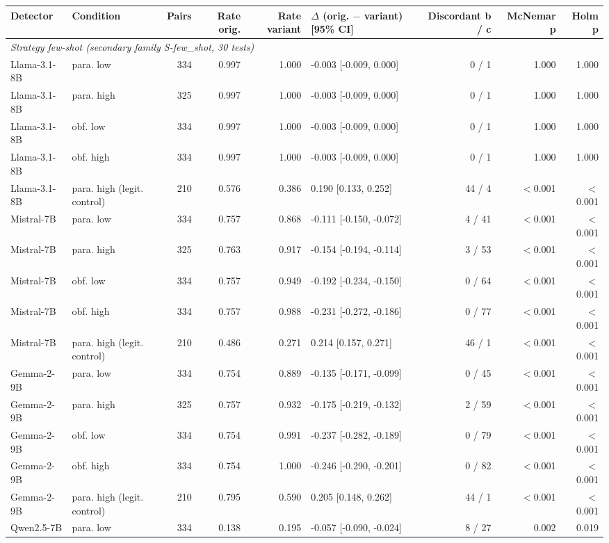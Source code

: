 \begin{tabular}{llrrrlrrr}
\toprule
Detector & Condition & Pairs & Rate orig. & Rate variant & $\Delta$ (orig. $-$ variant) [95\% CI] & Discordant b / c & McNemar p & Holm p \\
\midrule
\multicolumn{9}{l}{\textit{Strategy few-shot (secondary family S-few\_shot, 30 tests)}} \\
Llama-3.1-8B & para. low & 334 & 0.997 & 1.000 & -0.003 [-0.009, 0.000] & 0 / 1 & 1.000 & 1.000 \\
Llama-3.1-8B & para. high & 325 & 0.997 & 1.000 & -0.003 [-0.009, 0.000] & 0 / 1 & 1.000 & 1.000 \\
Llama-3.1-8B & obf. low & 334 & 0.997 & 1.000 & -0.003 [-0.009, 0.000] & 0 / 1 & 1.000 & 1.000 \\
Llama-3.1-8B & obf. high & 334 & 0.997 & 1.000 & -0.003 [-0.009, 0.000] & 0 / 1 & 1.000 & 1.000 \\
Llama-3.1-8B & para. high (legit. control) & 210 & 0.576 & 0.386 & 0.190 [0.133, 0.252] & 44 / 4 & $<$0.001 & $<$0.001 \\
Mistral-7B & para. low & 334 & 0.757 & 0.868 & -0.111 [-0.150, -0.072] & 4 / 41 & $<$0.001 & $<$0.001 \\
Mistral-7B & para. high & 325 & 0.763 & 0.917 & -0.154 [-0.194, -0.114] & 3 / 53 & $<$0.001 & $<$0.001 \\
Mistral-7B & obf. low & 334 & 0.757 & 0.949 & -0.192 [-0.234, -0.150] & 0 / 64 & $<$0.001 & $<$0.001 \\
Mistral-7B & obf. high & 334 & 0.757 & 0.988 & -0.231 [-0.272, -0.186] & 0 / 77 & $<$0.001 & $<$0.001 \\
Mistral-7B & para. high (legit. control) & 210 & 0.486 & 0.271 & 0.214 [0.157, 0.271] & 46 / 1 & $<$0.001 & $<$0.001 \\
Gemma-2-9B & para. low & 334 & 0.754 & 0.889 & -0.135 [-0.171, -0.099] & 0 / 45 & $<$0.001 & $<$0.001 \\
Gemma-2-9B & para. high & 325 & 0.757 & 0.932 & -0.175 [-0.219, -0.132] & 2 / 59 & $<$0.001 & $<$0.001 \\
Gemma-2-9B & obf. low & 334 & 0.754 & 0.991 & -0.237 [-0.282, -0.189] & 0 / 79 & $<$0.001 & $<$0.001 \\
Gemma-2-9B & obf. high & 334 & 0.754 & 1.000 & -0.246 [-0.290, -0.201] & 0 / 82 & $<$0.001 & $<$0.001 \\
Gemma-2-9B & para. high (legit. control) & 210 & 0.795 & 0.590 & 0.205 [0.148, 0.262] & 44 / 1 & $<$0.001 & $<$0.001 \\
Qwen2.5-7B & para. low & 334 & 0.138 & 0.195 & -0.057 [-0.090, -0.024] & 8 / 27 & 0.002 & 0.019 \\

\end{tabular}
